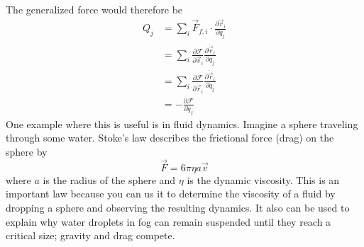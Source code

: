 \documentclass{article}
\begin{document}
The generalized force would therefore be
\begin{align}
  Q_j &= \sum_i \vec{F}_{f, i}\cdot\frac{\partial \vec{r}_i}{\partial q_j} \\
      &= \sum_i\frac{\partial \mathcal{F}}{\partial \vec{v}_i}\frac{\partial \dot{\vec{r}}_i}{\partial \dot{q}_j} \\
      &= \sum_i\frac{\partial \mathcal{F}}{\partial \dot{\vec{r}}_i}\frac{\partial \dot{\vec{r}}_i}{\partial \dot{q}_j} \\
      &= -\frac{\partial \mathcal{F}}{\partial \dot{q}_j }
\end{align}
One example where this is useful is in fluid dynamics. Imagine a sphere
traveling through some water. Stoke's law describes the frictional force (drag)
on the sphere by
\begin{equation}
  \vec{F} = 6\pi\eta a \vec{v}
\end{equation}
where $a$ is the radius of the sphere and $\eta$ is the dynamic viscosity. This
is an important law because you can us it to determine the viscosity of a fluid
by dropping a sphere and observing the resulting dynamics. It also can be used
to explain why water droplets in fog can remain suspended until they reach a
critical size; gravity and drag compete.  
\end{document}
